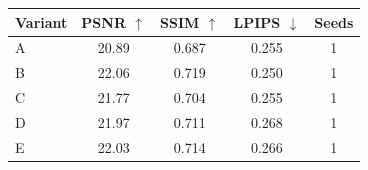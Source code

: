 \begin{tabular}{lcccc}
\toprule
Variant & PSNR $\uparrow$ & SSIM $\uparrow$ & LPIPS $\downarrow$ & Seeds \\
\midrule
A & 20.89 & 0.687 & 0.255 & 1 \\
B & 22.06 & 0.719 & 0.250 & 1 \\
C & 21.77 & 0.704 & 0.255 & 1 \\
D & 21.97 & 0.711 & 0.268 & 1 \\
E & 22.03 & 0.714 & 0.266 & 1 \\
\bottomrule
\end{tabular}

